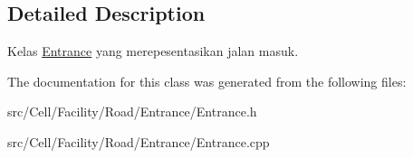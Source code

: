 \subsection{Detailed Description}
Kelas \hyperlink{classEntrance}{Entrance} yang merepesentasikan jalan masuk. 

The documentation for this class was generated from the following files\+:\begin{DoxyCompactItemize}
\item 
src/\+Cell/\+Facility/\+Road/\+Entrance/Entrance.\+h\item 
src/\+Cell/\+Facility/\+Road/\+Entrance/Entrance.\+cpp\end{DoxyCompactItemize}
